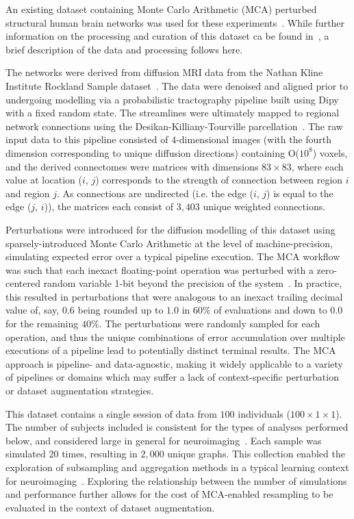 \documentclass[10pt]{SelfArx} %
\newcommand{\new}[1]{\color{blue}#1\color{black}\xspace}
\begin{document}
An existing dataset containing Monte Carlo Arithmetic (MCA) perturbed structural human brain networks was used for
these experiments~\cite{Kiar2020-yz}. \new{While further information on the processing and curation of this dataset ca
be found in~\cite{Kiar2020-kz}, a brief description of the data and processing follows here.}

\new{The networks were derived from diffusion MRI data from the Nathan Kline Institute Rockland Sample
dataset~\cite{zuo2014open}. The data were denoised and aligned prior to undergoing modelling via a probabilistic
tractography pipeline built using Dipy~\cite{Garyfallidis2014-ql} with a fixed random state. The streamlines were
ultimately mapped to regional network connections using the Desikan-Killiany-Tourville
parcellation~\cite{Klein2012-vi}. The raw input data to this pipeline consisted of $4$-dimensional images (with the 
fourth dimension corresponding to unique diffusion directions) containing O($10^8$) voxels, and the derived
connectomes were matrices with dimensions $83 \times 83$, where each value at location ($i$, $j$) corresponds to the
strength of connection between region $i$ and region $j$. As connections are undirected (i.e. the edge ($i$, $j$) is
equal to the edge ($j$, $i$)), the matrices each consist of $3,403$ unique weighted connections.}

\new{Perturbations were} introduced for \new{the diffusion modelling} of this dataset \new{using sparsely-introduced
Monte Carlo Arithmetic} at the level of machine-precision, simulating expected error over a typical pipeline execution.
\new{The MCA workflow was such that each inexact floating-point operation was perturbed with a zero-centered random
variable 1-bit beyond the precision of the system~\cite{Denis2016-wo,Parker1997-qq}. In practice, this resulted in
perturbations that were analogous to an inexact trailing decimal value of, say, $0.6$ being rounded up to $1.0$ in
$60\%$ of evaluations and down to $0.0$ for the remaining $40\%$. The perturbations were randomly sampled for each
operation, and thus the unique combinations of error accumulation over multiple executions of a pipeline lead to
potentially distinct terminal results. The MCA approach is pipeline- and data-agnostic, making it widely applicable to
a variety of pipelines or domains which may suffer a lack of context-specific perturbation or dataset augmentation
strategies.}

This dataset contains a single session of data from $100$ individuals ($100\times 1 \times1$). \new{The number of
subjects included is consistent for the types of analyses performed below, and considered large in general for
neuroimaging~\cite{neuroimagingsamplesize}.} Each sample was simulated $20$ times, resulting in $2,000$ unique graphs.
This collection enabled the exploration of subsampling and aggregation methods in a typical learning context for
neuroimaging~\cite{Dimitriadis2017-pd,Buchanan2014-pm}. Exploring the relationship between the number of simulations
and performance further allows for the cost of MCA-enabled resampling to be evaluated \new{in the context of} dataset
augmentation.
\end{document}
